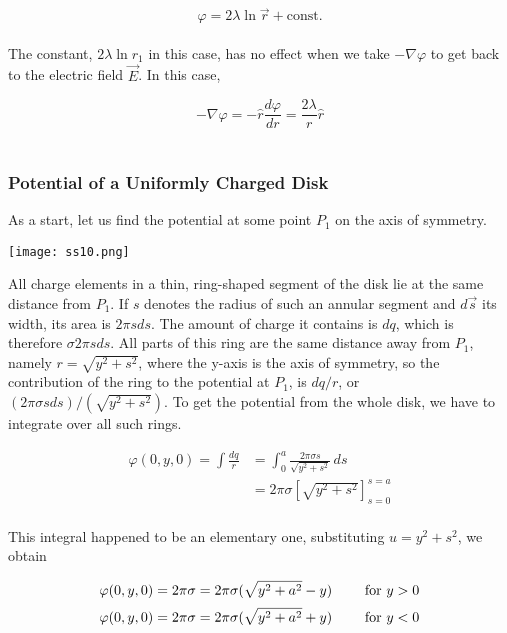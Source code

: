 \documentclass[svgnames]{article}
\begin{document}
\[ \varphi = 2\lambda \ln \vec{r} + \text{const.} \] \\

The constant, $2\lambda \ln r_1$ in this case, has no effect when we take
$-\nabla \varphi$ to get back to the electric field $\vec{E}$. In this case,

\[ -\nabla \varphi = -\hat{r} \frac{d \varphi}{dr} = \frac{2\lambda}{r} \hat{r} \] \\

\subsubsection{Potential of a Uniformly Charged Disk} 

As a start, let us find the potential at some point $P_1$ on the axis of symmetry. 

\begin{center}
\texttt{[image: ss10.png]}
\end{center} 

All charge elements in a thin, ring-shaped segment of the disk lie at the same
distance from $P_1$. If $s$ denotes the radius of such an annular segment and
$d\vec{s}$ its width, its area is $2\pi s ds$. The amount of charge it contains
is $dq$, which is therefore $\sigma 2\pi s ds$. All parts of this ring are the
same distance away from $P_1$, namely $r = \sqrt{y^2 + s^2}$, where the y-axis
is the axis of symmetry, so the contribution of the ring to the potential at
$P_1$, is $dq / r$, or $(2\pi \sigma s ds)/(\sqrt{y^2 + s^2})$. To get the
potential from the whole disk, we have to integrate over all such rings.

\begin{align*} 
\varphi(0, y, 0) = \int \frac{dq}{r} &= \int_0^a \frac{2\pi \sigma s}{\sqrt{y^2 + s^2}}\,ds \\
&= 2\pi \sigma \left[\sqrt{y^2 + s^2 }\right]_{s=0}^{s=a} 
\end{align*} \\

This integral happened to be an elementary one, substituting $u = y^2 + s^2$, we obtain 

\[ \varphi(0, y, 0) = 2\pi\sigma = 2\pi \sigma (\sqrt{y^2 + a^2} - y) \hspace{20px} \text{ for $y > 0$} \]
\[ \varphi(0, y, 0) = 2\pi\sigma = 2\pi \sigma (\sqrt{y^2 + a^2} + y) \hspace{20px} \text{ for $y < 0$} \]\\
\end{document}

